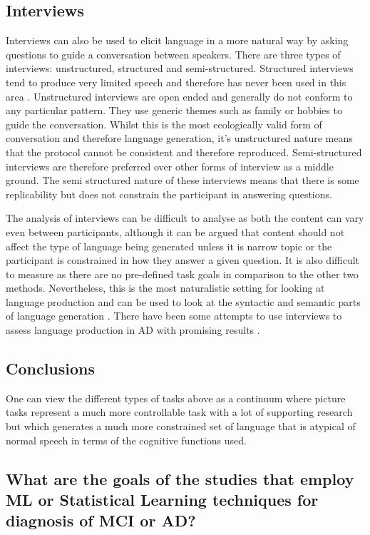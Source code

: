\documentclass[10pt, letterpaper, twoside, openany]{thesis}
\begin{document}
\subsection{Interviews}
Interviews can also be used to elicit language in a more natural way by asking questions to guide a conversation between speakers. There are three types of interviews: unstructured, structured and semi-structured. Structured interviews tend to produce very limited speech and therefore has never been used in this area \cite{Boschi2017}. Unstructured interviews are open ended and generally do not conform to any particular pattern. They use generic themes such as family or hobbies to guide the conversation. Whilst this is the most ecologically valid form of conversation and therefore language generation, it's unstructured nature means that the protocol cannot be consistent and therefore reproduced. Semi-structured interviews are therefore preferred over other forms of interview as a middle ground. The semi structured nature of these interviews means that there is some replicability but does not constrain the participant in answering questions.
\par
The analysis of interviews can be difficult to analyse as both the content can vary even between participants, although it can be argued that content should not affect the type of language being generated unless it is narrow topic or the participant is constrained in how they answer a given question. It is also difficult to measure as there are no pre-defined task goals in comparison to the other two methods. Nevertheless, this is the most naturalistic setting for looking at language production and can be used to look at the syntactic and semantic parts of language generation \cite{Sajjadi2012}. There have been some attempts to use interviews to assess language production in AD with promising results \cite{Asgari2017, Guinn2015}.
\par
\subsection{Conclusions}
One can view the different types of tasks above as a continuum where picture tasks represent a much more controllable task with a lot of supporting research but which generates a much more constrained set of language that is atypical of normal speech in terms of the cognitive functions used. 


\subsection{What are the goals of the studies that employ ML or Statistical Learning techniques for diagnosis of MCI or AD?}
\end{document}
